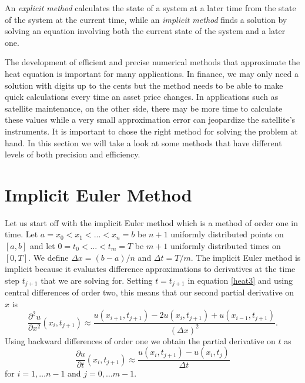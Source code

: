 \documentclass[00main.tex]{subfiles}
\begin{document}
\begin{defi}
An \emph{explicit method} calculates the state of a system at a later time from the state of the system at the current time, while an \emph{implicit method} finds a solution by solving an equation involving both the current state of the system and a later one.
\end{defi}


The development of efficient and precise numerical methods that approximate the heat equation is important for many applications. In finance, we may only need a solution with digits up to the cents but the method needs to be able to make quick calculations every time an asset price changes. In applications such as satellite maintenance, on the other side, there may be more time to calculate these values while a very small approximation error can jeopardize the satellite's instruments. It is important to chose the right method for solving the problem at hand. In this section we will take a look at some methods that have different levels of both precision and efficiency.




\section{Implicit Euler Method}


Let us start off with the implicit Euler method which is a method of order one in time. Let $a=x_0 < x_1 < ... < x_n=b$ be $n+1$ uniformly distributed points on $[a,b]$ and let $0= t_0 < ... < t_m = T$ be $m+1$ uniformly distributed times on $[0,T]$. We define $\Delta x = (b-a)/n$ and $\Delta t = T/m$. The implicit Euler method is implicit because it evaluates difference approximations to derivatives at the time step $t_{j+1}$ that we are solving for. Setting $t = t_{j+1}$ in equation \eqref{heat3} and using central differences of order two, this means that our second partial derivative on $x$ is
\[ \frac{\partial^2 u}{\partial x^2} (x_i, t_{j+1}) \approx \frac{u (x_{i+1}, t_{j+1}) - 2u (x_{i}, t_{j+1}) + u (x_{i-1}, t_{j+1})}{(\Delta x)^2}. \]
Using backward differences of order one we obtain the partial derivative on $t$ as
\[ \frac{\partial u}{\partial t} (x_i, t_{j+1}) \approx \frac{u (x_{i}, t_{j+1}) - u (x_{i}, t_{j})}{\Delta t} \] for $i=1,\hdots n-1$ and $j=0, \hdots m-1$.
\end{document}
